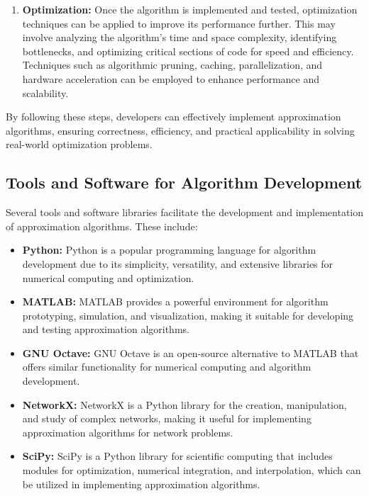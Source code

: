 \documentclass[12pt]{book} %
\begin{document}
\begin{enumerate}
    \item \textbf{Optimization:} Once the algorithm is implemented and tested, optimization techniques can be applied to improve its performance further. This may involve analyzing the algorithm's time and space complexity, identifying bottlenecks, and optimizing critical sections of code for speed and efficiency. Techniques such as algorithmic pruning, caching, parallelization, and hardware acceleration can be employed to enhance performance and scalability.
\end{enumerate}

By following these steps, developers can effectively implement approximation algorithms, ensuring correctness, efficiency, and practical applicability in solving real-world optimization problems.


\subsection{Tools and Software for Algorithm Development}

Several tools and software libraries facilitate the development and implementation of approximation algorithms. These include:

\begin{itemize}
    \item \textbf{Python:} Python is a popular programming language for algorithm development due to its simplicity, versatility, and extensive libraries for numerical computing and optimization.
    \item \textbf{MATLAB:} MATLAB provides a powerful environment for algorithm prototyping, simulation, and visualization, making it suitable for developing and testing approximation algorithms.
    \item \textbf{GNU Octave:} GNU Octave is an open-source alternative to MATLAB that offers similar functionality for numerical computing and algorithm development.
    \item \textbf{NetworkX:} NetworkX is a Python library for the creation, manipulation, and study of complex networks, making it useful for implementing approximation algorithms for network problems.
    \item \textbf{SciPy:} SciPy is a Python library for scientific computing that includes modules for optimization, numerical integration, and interpolation, which can be utilized in implementing approximation algorithms.
\end{itemize}
\end{document}
